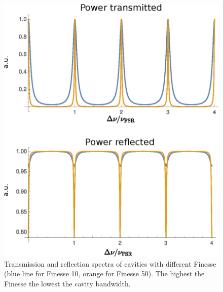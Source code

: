 \begin{figure}
	\centering
	\includegraphics[width=0.9\linewidth]{images/reflected.eps}
	\caption{Transmission and reflection spectra of cavities with different Finesse (blue line for Finesse 10, orange for Finesse 50). The highest the Finesse the lowest the cavity bandwidth.}
	\label{fig:reflected}
\end{figure}


